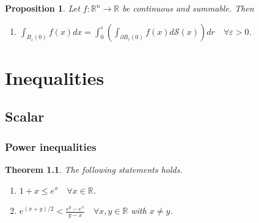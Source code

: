\documentclass[11pt,a4paper]{report}
\newtheorem{theorem}{Theorem}[section]
\newtheorem{proposition}[theorem]{Proposition}
\theoremstyle{definition}
\begin{document}
\begin{proposition}

	Let $f: \mathbb{R}^{n} \rightarrow \mathbb{R}$ be continuous and summable. 
	Then
	\begin{enumerate}[label=(\alph*)]
	\rm\item $\displaystyle \int_{B_{\varepsilon}(0)} f(x) dx = \int_{0}^{\varepsilon} \left( \int_{\partial B_r(0)} f(x) d\mathcal{S}(x) \right) dr \quad \forall \varepsilon>0$.
	\end{enumerate}
	\end{proposition}

\chapter{Inequalities} 

\section{Scalar}

\subsection{Power inequalities}

\begin{theorem}
	The following statements holds.
	\begin{enumerate}[label=(\alph*)] 
		\rm\item $1 + x \leq e^{x} \quad \forall x \in \mathbb{R}$.
		\rm\item $\displaystyle e^{(x + y)/2} < \frac{e^{y} - e^{x}}{y - x} \quad \forall x, y \in \mathbb{R}$ with $x \neq y$.
	\end{enumerate}
\end{theorem}
\end{document}
